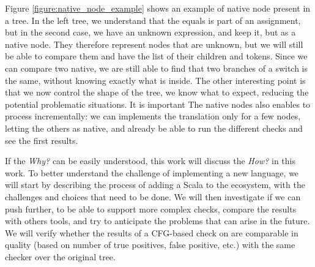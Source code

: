 Figure \ref{figure:native_node_example} shows an example of native node present in a \slang{} tree. In the left tree, we understand that the equals is part of an assignment, but in the second case, we have an unknown expression, and keep it, but as a native node.
They therefore represent nodes that are unknown, but we will still be able to compare them and have the list of their children and tokens. 
Since we can compare two native, we are still able to find that two branches of a switch is the same, without knowing exactly what is inside. 
The other interesting point is that we now control the shape of the tree, we know what to expect, reducing the potential problematic situations.
It is important The native nodes also enables to process incrementally: we can implements the translation only for a few nodes, letting the others as native, and already be able to run the different checks and see the first results.


If the \emph{Why?} can be easily understood, this work will discuss the \emph{How?} in this work. 
To better understand the challenge of implementing a new language, we will start by describing the process of adding a Scala to the ecosystem, with the challenges and choices that need to be done. 
We will then investigate if we can push \slang{} further, to be able to support more complex checks, compare the results with others tools, and try to anticipate the problems that can arise in the future.
We will verify whether the results of a CFG-based check on \slang{} are comparable in quality (based on number of true positives, false positive, etc.) with the same checker over the original tree.




